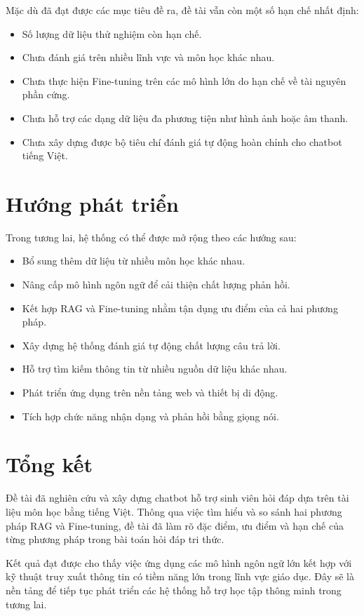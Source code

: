 \documentclass[12pt,a4paper]{report}
\begin{document}
	Mặc dù đã đạt được các mục tiêu đề ra, đề tài vẫn còn một số hạn chế nhất định:
	
	\begin{itemize}
		\item Số lượng dữ liệu thử nghiệm còn hạn chế.
		\item Chưa đánh giá trên nhiều lĩnh vực và môn học khác nhau.
		\item Chưa thực hiện Fine-tuning trên các mô hình lớn do hạn chế về tài nguyên phần cứng.
		\item Chưa hỗ trợ các dạng dữ liệu đa phương tiện như hình ảnh hoặc âm thanh.
		\item Chưa xây dựng được bộ tiêu chí đánh giá tự động hoàn chỉnh cho chatbot tiếng Việt.
	\end{itemize}
	
	\section{Hướng phát triển}
	
	Trong tương lai, hệ thống có thể được mở rộng theo các hướng sau:
	
	\begin{itemize}
		\item Bổ sung thêm dữ liệu từ nhiều môn học khác nhau.
		\item Nâng cấp mô hình ngôn ngữ để cải thiện chất lượng phản hồi.
		\item Kết hợp RAG và Fine-tuning nhằm tận dụng ưu điểm của cả hai phương pháp.
		\item Xây dựng hệ thống đánh giá tự động chất lượng câu trả lời.
		\item Hỗ trợ tìm kiếm thông tin từ nhiều nguồn dữ liệu khác nhau.
		\item Phát triển ứng dụng trên nền tảng web và thiết bị di động.
		\item Tích hợp chức năng nhận dạng và phản hồi bằng giọng nói.
	\end{itemize}
	
	\section{Tổng kết}
	
	Đề tài đã nghiên cứu và xây dựng chatbot hỗ trợ sinh viên hỏi đáp dựa trên tài liệu môn học bằng tiếng Việt. Thông qua việc tìm hiểu và so sánh hai phương pháp RAG và Fine-tuning, đề tài đã làm rõ đặc điểm, ưu điểm và hạn chế của từng phương pháp trong bài toán hỏi đáp tri thức.
	
	Kết quả đạt được cho thấy việc ứng dụng các mô hình ngôn ngữ lớn kết hợp với kỹ thuật truy xuất thông tin có tiềm năng lớn trong lĩnh vực giáo dục. Đây sẽ là nền tảng để tiếp tục phát triển các hệ thống hỗ trợ học tập thông minh trong tương lai.
	
	
\end{document}
